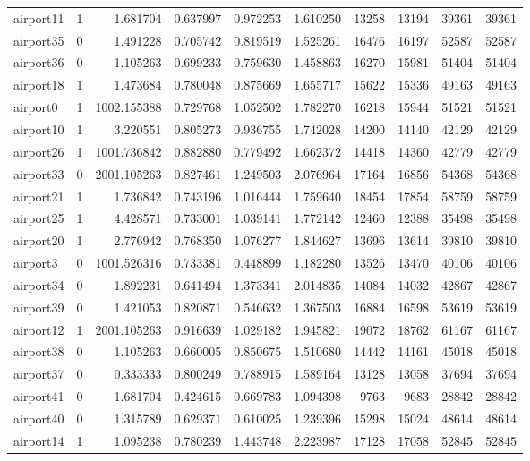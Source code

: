 \begin{longtable}{|l|r|r|r|r|r|r|r|r|r|}
airport11 & 1 & 1.681704 & 0.637997 & 0.972253 & 1.610250 & 13258 & 13194 & 39361 & 39361 \\
airport35 & 0 & 1.491228 & 0.705742 & 0.819519 & 1.525261 & 16476 & 16197 & 52587 & 52587 \\
airport36 & 0 & 1.105263 & 0.699233 & 0.759630 & 1.458863 & 16270 & 15981 & 51404 & 51404 \\
airport18 & 1 & 1.473684 & 0.780048 & 0.875669 & 1.655717 & 15622 & 15336 & 49163 & 49163 \\
airport0 & 1 & 1002.155388 & 0.729768 & 1.052502 & 1.782270 & 16218 & 15944 & 51521 & 51521 \\
airport10 & 1 & 3.220551 & 0.805273 & 0.936755 & 1.742028 & 14200 & 14140 & 42129 & 42129 \\
airport26 & 1 & 1001.736842 & 0.882880 & 0.779492 & 1.662372 & 14418 & 14360 & 42779 & 42779 \\
airport33 & 0 & 2001.105263 & 0.827461 & 1.249503 & 2.076964 & 17164 & 16856 & 54368 & 54368 \\
airport21 & 1 & 1.736842 & 0.743196 & 1.016444 & 1.759640 & 18454 & 17854 & 58759 & 58759 \\
airport25 & 1 & 4.428571 & 0.733001 & 1.039141 & 1.772142 & 12460 & 12388 & 35498 & 35498 \\
airport20 & 1 & 2.776942 & 0.768350 & 1.076277 & 1.844627 & 13696 & 13614 & 39810 & 39810 \\
airport3 & 0 & 1001.526316 & 0.733381 & 0.448899 & 1.182280 & 13526 & 13470 & 40106 & 40106 \\
airport34 & 0 & 1.892231 & 0.641494 & 1.373341 & 2.014835 & 14084 & 14032 & 42867 & 42867 \\
airport39 & 0 & 1.421053 & 0.820871 & 0.546632 & 1.367503 & 16884 & 16598 & 53619 & 53619 \\
airport12 & 1 & 2001.105263 & 0.916639 & 1.029182 & 1.945821 & 19072 & 18762 & 61167 & 61167 \\
airport38 & 0 & 1.105263 & 0.660005 & 0.850675 & 1.510680 & 14442 & 14161 & 45018 & 45018 \\
airport37 & 0 & 0.333333 & 0.800249 & 0.788915 & 1.589164 & 13128 & 13058 & 37694 & 37694 \\
airport41 & 0 & 1.681704 & 0.424615 & 0.669783 & 1.094398 & 9763 & 9683 & 28842 & 28842 \\
airport40 & 0 & 1.315789 & 0.629371 & 0.610025 & 1.239396 & 15298 & 15024 & 48614 & 48614 \\
airport14 & 1 & 1.095238 & 0.780239 & 1.443748 & 2.223987 & 17128 & 17058 & 52845 & 52845 \\

\end{longtable}
